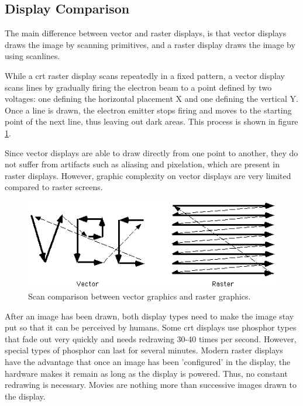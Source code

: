 \subsection{Display Comparison}
The main difference between vector and raster displays, is that vector displays draws the image by scanning primitives, and a raster display draws the image by using scanlines. 

While a \gls{crt} raster display scans repeatedly in a fixed pattern, a vector display scans lines by gradually firing the electron beam to a point defined by two voltages: one defining the horizontal placement X and one defining the vertical Y. 
Once a line is drawn, the electron emitter stops firing and moves to the starting point of the next line, thus leaving out dark areas. 
This process is shown in figure \ref{fig:vectorscan}.

Since vector displays are able to draw directly from one point to another, they do not suffer from artifacts such as aliasing and pixelation, which are present in raster displays\cite{vector-monitor}.
However, graphic complexity on vector displays are very limited compared to raster screens.

\begin{figure}[h!]
\centering \includegraphics[width=0.8\linewidth]{images/scan.png}
\caption{Scan comparison between vector graphics and raster graphics\cite{vecvsras}.}
\label{fig:vectorscan}
\end{figure}

After an image has been drawn, both display types need to make the image stay put so that it can be perceived by humans. 
Some \gls{crt} displays use phosphor types that fade out very quickly and needs redrawing 30-40 times per second\cite{vector-monitor}.
However, special types of phosphor can last for several minutes.
Modern raster displays have the advantage that once an image has been 'configured' in the display, the hardware makes it remain as long as the display is powered. 
Thus, no constant redrawing is necessary\cite{LCD-persistence}.
Movies are nothing more than successive images drawn to the display.

